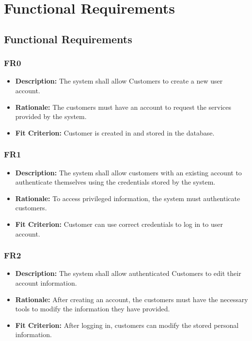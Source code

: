 \documentclass[12pt]{article}
\begin{document}
\section{Functional Requirements}
\subsection{Functional Requirements}
\subsubsection*{FR0}
\begin{itemize}
  \item \textbf{Description:} The system shall allow Customers to create a new user account.
  \item \textbf{Rationale:} The customers must have an account to request the services provided by the system.
  \item \textbf{Fit Criterion:} Customer is created in and stored in the database.
\end{itemize}
\subsubsection*{FR1}
\begin{itemize}
  \item \textbf{Description:} The system shall allow customers with an existing account to authenticate themselves using the credentials stored by the system.
  \item \textbf{Rationale:} To access privileged information, the system must authenticate customers.
  \item \textbf{Fit Criterion:} Customer can use correct credentials to log in to user account.
\end{itemize}
\subsubsection*{FR2}
\begin{itemize}
  \item \textbf{Description:} The system shall allow authenticated Customers to edit their account information.
  \item \textbf{Rationale:} After creating an account, the customers must have the necessary tools to modify the information they have provided.
  \item \textbf{Fit Criterion:} After logging in, customers can modify the stored personal information.
\end{itemize}
\end{document}
